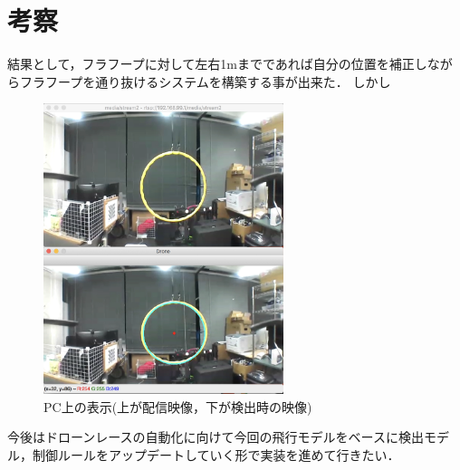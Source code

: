 \section{考察}
結果として，フラフープに対して左右1mまでであれば自分の位置を補正しながらフラフープを通り抜けるシステムを構築する事が出来た．
しかし

\begin{figure}[htbp]
  \begin{center}
    \includegraphics[clip,width=7.0cm]{img/sys-image.png}
    \caption{PC上の表示(上が配信映像，下が検出時の映像)}
    \label{fig:sys}
  \end{center}
\end{figure}

今後はドローンレースの自動化に向けて今回の飛行モデルをベースに検出モデル，制御ルールをアップデートしていく形で実装を進めて行きたい．
